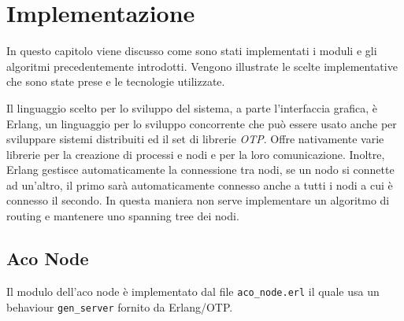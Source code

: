 \chapter{Implementazione}
In questo capitolo viene discusso come sono stati implementati i moduli e gli algoritmi precedentemente introdotti.
Vengono illustrate le scelte implementative che sono state prese e le tecnologie utilizzate.

Il linguaggio scelto per lo sviluppo del sistema, a parte l'interfaccia grafica, è Erlang, un linguaggio per lo sviluppo concorrente che può essere usato anche
per sviluppare sistemi distribuiti ed il set di librerie \textit{OTP}.  Offre nativamente varie librerie per la creazione di processi e nodi e per la loro comunicazione.
Inoltre, Erlang gestisce automaticamente la connessione tra nodi, se un nodo si connette ad un'altro, il primo sarà automaticamente connesso anche a tutti i nodi
a cui è connesso il secondo. In questa maniera non serve implementare un algoritmo di routing e mantenere uno spanning tree dei nodi.

\section{Aco Node}
Il modulo dell'aco node è implementato dal file \texttt{aco\_node.erl} il quale usa un behaviour \texttt{gen\_server} fornito da Erlang/OTP.
